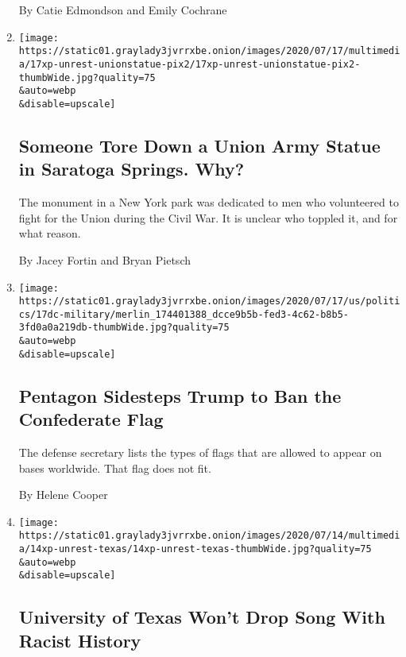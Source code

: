 \begin{enumerate}
  By Catie Edmondson and Emily Cochrane
\item
  \href{/2020/07/18/us/union-statue-saratoga-springs-ny.html}{}

  \texttt{[image: https://static01.graylady3jvrrxbe.onion/images/2020/07/17/multimedia/17xp-unrest-unionstatue-pix2/17xp-unrest-unionstatue-pix2-thumbWide.jpg?quality=75\\\&auto=webp\\\&disable=upscale]}

  \hypertarget{someone-tore-down-a-union-army-statue-in-saratoga-springs-why}{%
  \subsection{Someone Tore Down a Union Army Statue in Saratoga Springs.
  Why?}\label{someone-tore-down-a-union-army-statue-in-saratoga-springs-why}}

  The monument in a New York park was dedicated to men who volunteered
  to fight for the Union during the Civil War. It is unclear who toppled
  it, and for what reason.

  By Jacey Fortin and Bryan Pietsch
\item
  \href{/2020/07/17/us/politics/pentagon-trump-confederate-symbols.html}{}

  \texttt{[image: https://static01.graylady3jvrrxbe.onion/images/2020/07/17/us/politics/17dc-military/merlin\_174401388\_dcce9b5b-fed3-4c62-b8b5-3fd0a0a219db-thumbWide.jpg?quality=75\\\&auto=webp\\\&disable=upscale]}

  \hypertarget{pentagon-sidesteps-trump-to-ban-the-confederate-flag}{%
  \subsection{Pentagon Sidesteps Trump to Ban the Confederate
  Flag}\label{pentagon-sidesteps-trump-to-ban-the-confederate-flag}}

  The defense secretary lists the types of flags that are allowed to
  appear on bases worldwide. That flag does not fit.

  By Helene Cooper
\item
  \href{/2020/07/14/us/eyes-of-texas-football.html}{}

  \texttt{[image: https://static01.graylady3jvrrxbe.onion/images/2020/07/14/multimedia/14xp-unrest-texas/14xp-unrest-texas-thumbWide.jpg?quality=75\\\&auto=webp\\\&disable=upscale]}

  \hypertarget{university-of-texas-wont-drop-song-with-racist-history}{%
  \subsection{University of Texas Won't Drop Song With Racist
  History}\label{university-of-texas-wont-drop-song-with-racist-history}}


\end{enumerate}
